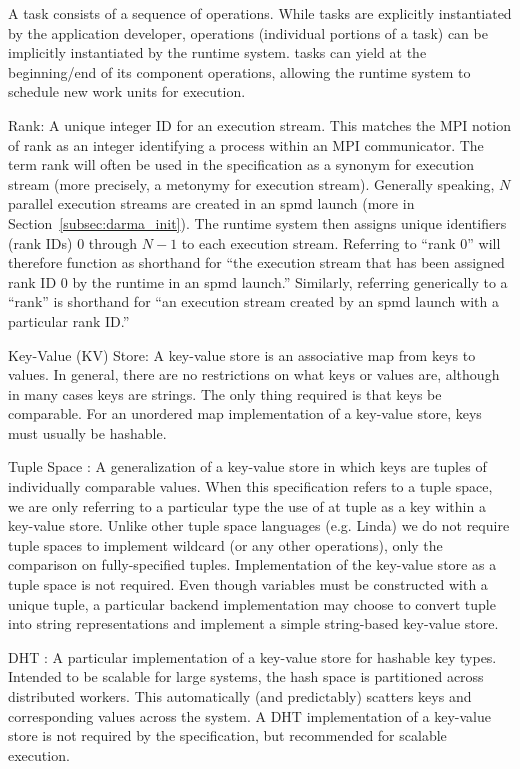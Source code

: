 \begin{compactdesc}
  A \gls{task} consists of a sequence of \glspl{operation}.
  While \glspl{task} are explicitly instantiated by the application developer,
  \glspl{operation} (individual portions of a \gls{task}) can be implicitly
  instantiated by the \gls{runtime system}.
  \Glspl{task} can yield at the beginning/end of its component
  \glspl{operation}, allowing the \gls{runtime system} to schedule new work units for execution.
\item [Rank:] A unique integer ID for an \gls{execution stream}. This matches
  the MPI notion of \gls{rank} as an integer identifying a process within an MPI communicator.
  The term \gls{rank} will often be used in the specification as a synonym for
  \gls{execution stream} (more precisely, a metonymy for \gls{execution stream}).
  Generally speaking, $N$ parallel \glspl{execution stream} are created in an
  \gls{spmd} launch (more in Section~\ref{subsec:darma_init}).
  The \gls{runtime system} then assigns unique identifiers (\gls{rank} IDs) $0$ through
  $N-1$ to each \gls{execution stream}.
  Referring to ``\gls{rank} 0'' will therefore function as shorthand for ``the
  \gls{execution stream} that has been assigned \gls{rank} ID 0 by the runtime
  in an \gls{spmd} launch.'' Similarly, referring generically to a
  ``\gls{rank}'' is shorthand for ``an \gls{execution stream} created by an
  \gls{spmd} launch with a particular \gls{rank} ID.''
\item [Key-Value (KV) Store:] A \gls{key-value store} is an associative map from
keys to values. In general, there are no restrictions on what keys or values are, although in many
cases keys are strings.  The only thing required is that keys be comparable.
For an unordered map implementation of a \gls{key-value store}, keys must usually be hashable.
\item [Tuple Space]: A generalization of a \gls{key-value store} in which keys
  are \glspl{tuple} of individually comparable values.
  When this specification refers to a \gls{tuple space}, we are only referring to a particular type
  the use of at \gls{tuple} as a key within a \gls{key-value store}.
  Unlike other \gls{tuple space} languages (e.g. \gls{Linda}) we do not require
  \glspl{tuple space} to implement wildcard (or any other operations), only the
  comparison on fully-specified \glspl{tuple}.  Implementation of the
  \gls{key-value store} as a \gls{tuple space} is not required.  
  Even though variables must be constructed with a unique \gls{tuple}, a
particular backend implementation may choose to convert
\gls{tuple} into string representations and implement a simple string-based
\gls{key-value store}.
\item [\gls{DHT}]: A particular implementation of a
  \gls{key-value store} for hashable key types.
Intended to be scalable for large systems, the hash space is partitioned
across distributed workers.
This automatically (and predictably) scatters keys and corresponding
values across the system.
A \gls{DHT} implementation of a \gls{key-value store} is not required by the specification,
but recommended for scalable execution.
\end{compactdesc}



